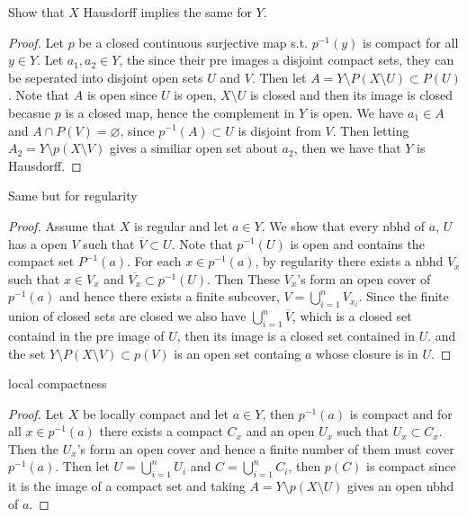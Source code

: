     \begin{alphaparts}
        \questionpart 
        Show that $X$ Hausdorff implies the same for $Y$. 

        \begin{proof}
            Let $p$ be a closed continuous surjective map s.t. $p^{-1}(y)$ is compact for all $y \in Y$. 
            Let $a_1,a_2 \in Y$, the since their pre images a disjoint compact sets, they can be seperated into 
            disjoint open sets $U$ and $V$. Then let $A = Y \setminus P(X \setminus U) \subset P(U)$. Note that $A$ is open since $U$ is open, $X \setminus U$ is closed and then its image is closed becasue $p$ is a closed map, hence the complement in $Y$ is open. We have 
            $a_1 \in A$ and $A \cap P(V) = \varnothing$, since $p^{-1}(A) \subset U$ is disjoint from $V$. Then letting $A_2 = Y \setminus p(X \setminus V)$ gives a similiar open set about $a_2$, then we have that $Y$ is Hausdorff. 


        \end{proof}


        \questionpart 
        Same but for regularity
        \begin{proof}
            Assume that $X$ is regular and let $a \in Y$. We show that every nbhd of $a$, $U$ has a open $V$ such that $\overline{V} \subset U$. Note that $p^{-1}(U)$ is open and contains the compact set $P^{-1}(a)$. 
            For each $x \in p^{-1}(a)$, by regularity there exists a nbhd $V_x$ such that $x \in V_x$ and $\overline{V_x} \subset p^{-1}(U)$. Then These $V_x$'s form an open cover of $p^{-1}(a)$ and hence there exists a finite subcover, 
            $V = \bigcup_{i = 1}^n V_{x_i}$. Since the finite union of closed sets are closed we also have $\bigcup_{i =1}^n \overline{V}$, which is a closed set containd in the pre image of $U$, then its image is a closed set contained in $U$. 
            and the set $Y \setminus P(X \setminus V) \subset p(V)$ is an open set containg $a$ whose closure is in $U$. 

        \end{proof}

        \questionpart 
        local compactness 

        \begin{proof}
            Let $X$ be locally compact and let $a \in Y$, then $p^{-1}(a)$ is compact and for all $x \in p^{-1}(a)$ there exists a compact $C_x$ and an open $U_x$ such that $U_x \subset C_x$. 
            Then the $U_x$'s form an open cover and hence a finite number of them must cover $p^{-1}(a)$. Then let 
            $U = \bigcup_{i = 1}^n U_i$ and $C = \bigcup_{i = 1}^n C_i$, then $p(C)$ is compact since it is the image of a compact set and taking $A = Y \setminus p(X \setminus U)$ gives an open nbhd of $a$. 


\end{proof}
\end{alphaparts}
